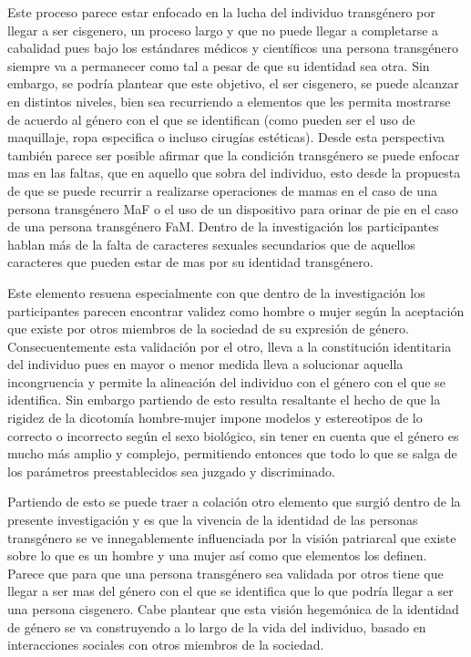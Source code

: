 Este proceso parece estar enfocado en la lucha del individuo transgénero por
llegar a ser cisgenero, un proceso largo y que no puede llegar a completarse a
cabalidad pues bajo los estándares médicos y científicos una persona transgénero
siempre va a permanecer como tal a pesar de que su identidad sea otra. Sin
embargo, se podría plantear que este objetivo, el ser cisgenero, se puede
alcanzar en distintos niveles, bien sea recurriendo a elementos que les permita
mostrarse de acuerdo al género con el que se identifican (como pueden ser el uso
de maquillaje, ropa especifica o incluso cirugías estéticas). Desde esta
perspectiva también parece ser posible afirmar que la condición transgénero se
puede enfocar mas en las faltas, que en aquello que sobra del individuo, esto
desde la propuesta de que se puede recurrir a realizarse operaciones de mamas en
el caso de una persona transgénero MaF o el uso de un dispositivo para orinar de
pie en el caso de una persona transgénero FaM. Dentro de la investigación los
participantes hablan más de la falta de caracteres sexuales secundarios que de
aquellos caracteres que pueden estar de mas por su identidad transgénero.

Este elemento resuena especialmente con que dentro de la investigación los
participantes parecen encontrar validez como hombre o mujer según la aceptación
que existe por otros miembros de la sociedad de su expresión de género.
Consecuentemente esta validación por el otro, lleva a la constitución
identitaria del individuo pues en mayor o menor medida lleva a solucionar
aquella incongruencia y permite la alineación del individuo con el género con el
que se identifica. Sin embargo partiendo de esto resulta resaltante el hecho de
que la rigidez de la dicotomía hombre-mujer impone modelos y estereotipos de lo
correcto o incorrecto según el sexo biológico, sin tener en cuenta que el género
es mucho más amplio y complejo, permitiendo entonces que todo lo que se salga de
los parámetros preestablecidos sea juzgado y discriminado.

Partiendo de esto se puede traer a colación otro elemento que surgió dentro de
la presente investigación y es que la vivencia de la identidad de las personas
transgénero se ve innegablemente influenciada por la visión patriarcal que
existe sobre lo que es un hombre y una mujer así como que elementos los definen.
Parece que para que una persona transgénero sea validada por otros tiene que
llegar a ser mas del género con el que se identifica que lo que podría llegar a
ser una persona cisgenero. Cabe plantear que esta visión hegemónica de la
identidad de género se va construyendo a lo largo de la vida del individuo,
basado en interacciones sociales con otros miembros de la sociedad.

